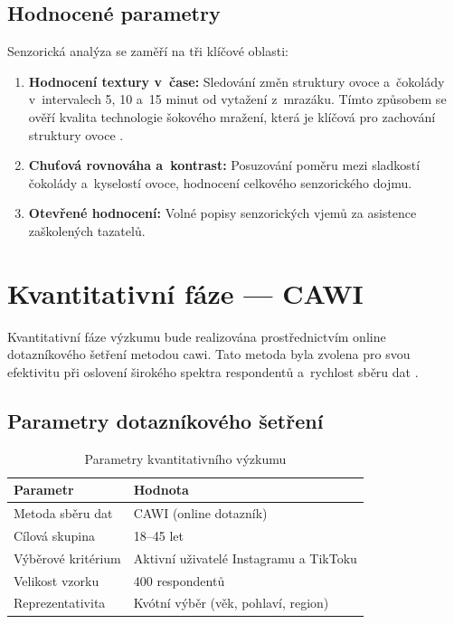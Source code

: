 \subsection{Hodnocené parametry}

Senzorická analýza se zaměří na tři klíčové oblasti:

\begin{enumerate}
  \item \textbf{Hodnocení textury v~čase:} Sledování změn struktury ovoce a~čokolády v~intervalech 5, 10 a~15 minut od vytažení z~mrazáku. Tímto způsobem se ověří kvalita technologie šokového mražení, která je klíčová pro zachování struktury ovoce \parencite{grover_negi_2023}.
  \item \textbf{Chuťová rovnováha a~kontrast:} Posuzování poměru mezi sladkostí čokolády a~kyselostí ovoce, hodnocení celkového senzorického dojmu.
  \item \textbf{Otevřené hodnocení:} Volné popisy senzorických vjemů za asistence zaškolených tazatelů.
\end{enumerate}

\section{Kvantitativní fáze — CAWI}
\label{sec:meth_cawi}

Kvantitativní fáze výzkumu bude realizována prostřednictvím online dotazníkového šetření metodou \gls{cawi}. Tato metoda byla zvolena pro svou efektivitu při oslovení širokého spektra respondentů a~rychlost sběru dat \parencite{punch_2014}.

\subsection{Parametry dotazníkového šetření}

\begin{table}[H]
\centering
\caption{Parametry kvantitativního výzkumu}
\label{tab:cawi_params}
\begin{tabular}{ll}
\toprule
\textbf{Parametr} & \textbf{Hodnota} \\
\midrule
Metoda sběru dat & CAWI (online dotazník) \\
Cílová skupina & 18--45 let \\
Výběrové kritérium & Aktivní uživatelé Instagramu a TikToku \\
Velikost vzorku & 400 respondentů \\
Reprezentativita & Kvótní výběr (věk, pohlaví, region) \\
\bottomrule
\end{tabular}
\end{table}

